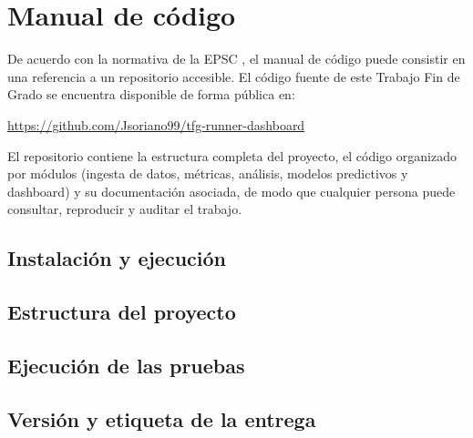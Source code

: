 \chapter{Manual de código}
\label{ap:manual-codigo}

De acuerdo con la normativa de la EPSC \cite{reglamento2024,guiaGII2025}, el
manual de código puede consistir en una referencia a un repositorio accesible.
El código fuente de este Trabajo Fin de Grado se encuentra disponible de forma
pública en:

\begin{center}
\url{https://github.com/Jsoriano99/tfg-runner-dashboard}
\end{center}

El repositorio contiene la estructura completa del proyecto, el código
organizado por módulos (ingesta de datos, métricas, análisis, modelos
predictivos y dashboard) y su documentación asociada, de modo que cualquier
persona puede consultar, reproducir y auditar el trabajo.

\section*{Instalación y ejecución}
\label{sec:codigo-instalacion}


\section*{Estructura del proyecto}
\label{sec:codigo-estructura}


\section*{Ejecución de las pruebas}
\label{sec:codigo-pruebas}


\section*{Versión y etiqueta de la entrega}
\label{sec:codigo-version}

